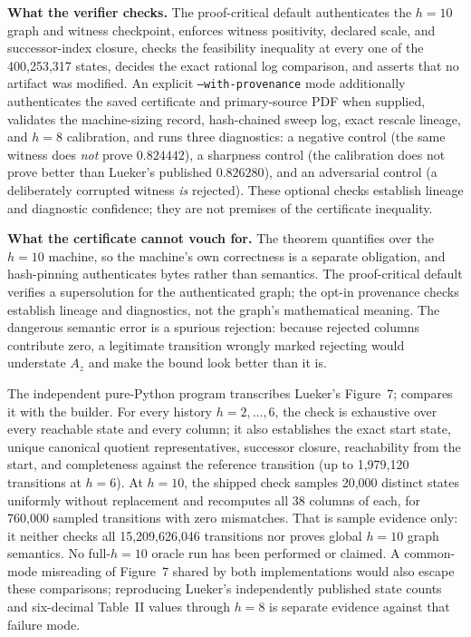 \documentclass[11pt]{article}
\theoremstyle{plain}
\begin{document}
\textbf{What the verifier checks.} The proof-critical default authenticates the $h=10$ graph and witness checkpoint, enforces witness positivity, declared scale, and successor-index closure, checks the feasibility inequality at every one of the 400{,}253{,}317 states, decides the exact rational log comparison, and asserts that no artifact was modified. An explicit \texttt{--with-provenance} mode additionally authenticates the saved certificate and primary-source PDF when supplied, validates the machine-sizing record, hash-chained sweep log, exact rescale lineage, and $h=8$ calibration, and runs three diagnostics: a negative control (the same witness does \emph{not} prove $0.824442$), a sharpness control (the calibration does not prove better than Lueker's published $0.826280$), and an adversarial control (a deliberately corrupted witness \emph{is} rejected). These optional checks establish lineage and diagnostic confidence; they are not premises of the certificate inequality.

\textbf{What the certificate cannot vouch for.} The theorem quantifies over the $h=10$ machine, so the machine's own correctness is a separate obligation, and hash-pinning authenticates bytes rather than semantics. The proof-critical default verifies a supersolution for the authenticated graph; the opt-in provenance checks establish lineage and diagnostics, not the graph's mathematical meaning. The dangerous semantic error is a spurious rejection: because rejected columns contribute zero, a legitimate transition wrongly marked rejecting would understate $A_z$ and make the bound look better than it is.

The independent pure-Python program  transcribes Lueker's Figure~7;  compares it with the builder. For every history $h=2,\ldots,6$, the check is exhaustive over every reachable state and every column; it also establishes the exact start state, unique canonical quotient representatives, successor closure, reachability from the start, and completeness against the reference transition (up to 1{,}979{,}120 transitions at $h=6$). At $h=10$, the shipped check samples 20{,}000 distinct states uniformly without replacement and recomputes all 38 columns of each, for 760{,}000 sampled transitions with zero mismatches. That is sample evidence only: it neither checks all 15{,}209{,}626{,}046 transitions nor proves global $h=10$ graph semantics. No full-$h=10$ oracle run has been performed or claimed. A common-mode misreading of Figure~7 shared by both implementations would also escape these comparisons; reproducing Lueker's independently published state counts and six-decimal Table~II values through $h=8$ is separate evidence against that failure mode.
\end{document}
